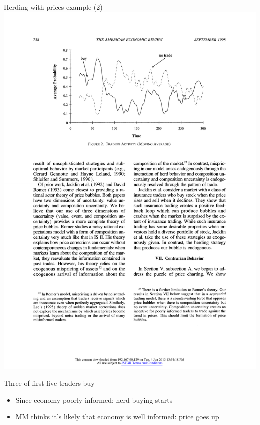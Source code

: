 \documentclass[english,10pt
,aspectratio=169
]{beamer}
\begin{document}
\begin{frame}{Herding with prices example (2)}
	\includegraphics[width=0.12\paperwidth]{pics/Trade1} \hfill \hfill
	
	Three of first five traders buy  
	\begin{itemize}
		\item Since economy poorly informed: herd buying starts
		\item MM thinks it's likely that economy is well informed: price goes up
	\end{itemize}
\end{frame}
\end{document}
